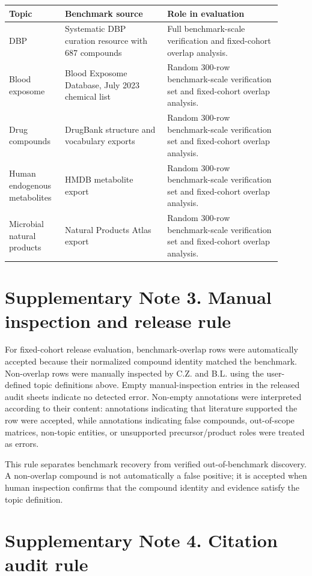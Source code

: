 \documentclass[10pt]{article}
\begin{document}
\begin{longtable}{p{0.18\linewidth}p{0.34\linewidth}p{0.38\linewidth}}
\toprule
Topic & Benchmark source & Role in evaluation \\
\midrule
DBP & Systematic DBP curation resource with 687 compounds & Full benchmark-scale verification and fixed-cohort overlap analysis. \\
Blood exposome & Blood Exposome Database, July 2023 chemical list & Random 300-row benchmark-scale verification set and fixed-cohort overlap analysis. \\
Drug compounds & DrugBank structure and vocabulary exports & Random 300-row benchmark-scale verification set and fixed-cohort overlap analysis. \\
Human endogenous metabolites & HMDB metabolite export & Random 300-row benchmark-scale verification set and fixed-cohort overlap analysis. \\
Microbial natural products & Natural Products Atlas export & Random 300-row benchmark-scale verification set and fixed-cohort overlap analysis. \\
\bottomrule
\end{longtable}

\section*{Supplementary Note 3. Manual inspection and release rule}

For fixed-cohort release evaluation, benchmark-overlap rows were automatically accepted because their normalized compound identity matched the benchmark. Non-overlap rows were manually inspected by C.Z. and B.L. using the user-defined topic definitions above. Empty manual-inspection entries in the released audit sheets indicate no detected error. Non-empty annotations were interpreted according to their content: annotations indicating that literature supported the row were accepted, while annotations indicating false compounds, out-of-scope matrices, non-topic entities, or unsupported precursor/product roles were treated as errors.

This rule separates benchmark recovery from verified out-of-benchmark discovery. A non-overlap compound is not automatically a false positive; it is accepted when human inspection confirms that the compound identity and evidence satisfy the topic definition.

\section*{Supplementary Note 4. Citation audit rule}
\end{document}
